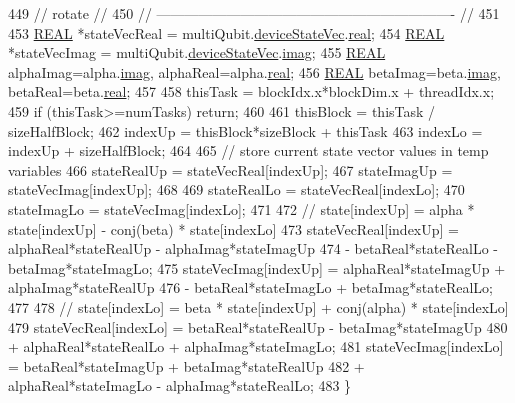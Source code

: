 \begin{DoxyCode}
449     \textcolor{comment}{//            rotate                                                //}
450     \textcolor{comment}{// ---------------------------------------------------------------- //}
451 
453     \mbox{\hyperlink{QuEST__precision_8h_a4b654506f18b8bfd61ad2a29a7e38c25}{REAL}} *stateVecReal = multiQubit.\mbox{\hyperlink{structMultiQubit_a59ac613486a41b8c9a4b6e79cc8d2cc3}{deviceStateVec}}.\mbox{\hyperlink{structComplexArray_a4195cac6c784ea1b6271f1c7dba1548a}{real}};
454     \mbox{\hyperlink{QuEST__precision_8h_a4b654506f18b8bfd61ad2a29a7e38c25}{REAL}} *stateVecImag = multiQubit.\mbox{\hyperlink{structMultiQubit_a59ac613486a41b8c9a4b6e79cc8d2cc3}{deviceStateVec}}.\mbox{\hyperlink{structComplexArray_a79dde47c7ae530c79cebfdf57b225968}{imag}};
455     \mbox{\hyperlink{QuEST__precision_8h_a4b654506f18b8bfd61ad2a29a7e38c25}{REAL}} alphaImag=alpha.\mbox{\hyperlink{structComplex_a1151948284b21c0052f203f23ab931d9}{imag}}, alphaReal=alpha.\mbox{\hyperlink{structComplex_a479ad939835457595fcca3ca55c06283}{real}};
456     \mbox{\hyperlink{QuEST__precision_8h_a4b654506f18b8bfd61ad2a29a7e38c25}{REAL}} betaImag=beta.\mbox{\hyperlink{structComplex_a1151948284b21c0052f203f23ab931d9}{imag}}, betaReal=beta.\mbox{\hyperlink{structComplex_a479ad939835457595fcca3ca55c06283}{real}};
457 
458     thisTask = blockIdx.x*blockDim.x + threadIdx.x;
459     \textcolor{keywordflow}{if} (thisTask>=numTasks) \textcolor{keywordflow}{return};
460 
461     thisBlock   = thisTask / sizeHalfBlock;
462     indexUp     = thisBlock*sizeBlock + thisTask%
463     indexLo     = indexUp + sizeHalfBlock;
464 
465     \textcolor{comment}{// store current state vector values in temp variables}
466     stateRealUp = stateVecReal[indexUp];
467     stateImagUp = stateVecImag[indexUp];
468 
469     stateRealLo = stateVecReal[indexLo];
470     stateImagLo = stateVecImag[indexLo];
471 
472     \textcolor{comment}{// state[indexUp] = alpha * state[indexUp] - conj(beta)  * state[indexLo]}
473     stateVecReal[indexUp] = alphaReal*stateRealUp - alphaImag*stateImagUp 
474         - betaReal*stateRealLo - betaImag*stateImagLo;
475     stateVecImag[indexUp] = alphaReal*stateImagUp + alphaImag*stateRealUp 
476         - betaReal*stateImagLo + betaImag*stateRealLo;
477 
478     \textcolor{comment}{// state[indexLo] = beta  * state[indexUp] + conj(alpha) * state[indexLo]}
479     stateVecReal[indexLo] = betaReal*stateRealUp - betaImag*stateImagUp 
480         + alphaReal*stateRealLo + alphaImag*stateImagLo;
481     stateVecImag[indexLo] = betaReal*stateImagUp + betaImag*stateRealUp 
482         + alphaReal*stateImagLo - alphaImag*stateRealLo;
483 \}
\end{DoxyCode}
\mbox{\label{QuEST__env__localGPU_8cu_a793584932ae384c82e7e42db7d35d18d}} 
